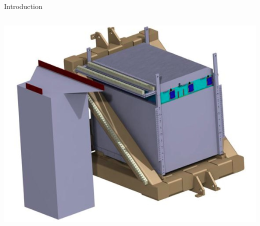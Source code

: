 \documentclass[10pt]{beamer}
\begin{document}
\begin{frame}[shrink=5]{Introduction}
\begin{columns}
\begin{column}{0.4\textwidth}
      \centerline{\includegraphics[height=0.25\textheight]{jpg/DHCALProtoSchema}}
    \end{column}
  \end{columns}
\end{frame}
\end{document}
